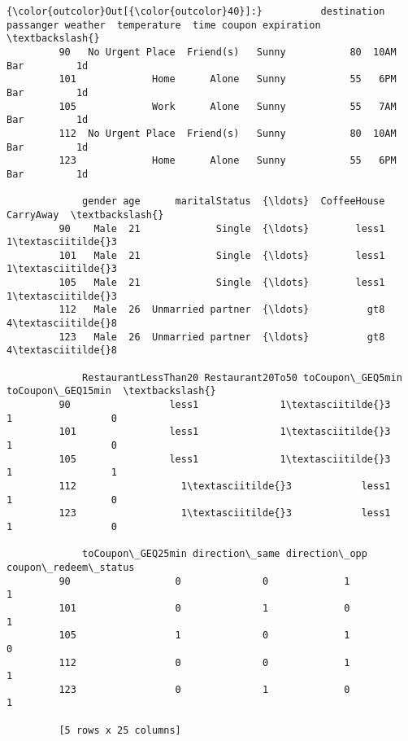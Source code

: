 \documentclass[11pt]{article}
\begin{document}
\begin{Verbatim}[commandchars=\\\{\}]
{\color{outcolor}Out[{\color{outcolor}40}]:}          destination  passanger weather  temperature  time coupon expiration  \textbackslash{}
         90   No Urgent Place  Friend(s)   Sunny           80  10AM    Bar         1d   
         101             Home      Alone   Sunny           55   6PM    Bar         1d   
         105             Work      Alone   Sunny           55   7AM    Bar         1d   
         112  No Urgent Place  Friend(s)   Sunny           80  10AM    Bar         1d   
         123             Home      Alone   Sunny           55   6PM    Bar         1d   
         
             gender age      maritalStatus  {\ldots}  CoffeeHouse CarryAway  \textbackslash{}
         90    Male  21             Single  {\ldots}        less1       1\textasciitilde{}3   
         101   Male  21             Single  {\ldots}        less1       1\textasciitilde{}3   
         105   Male  21             Single  {\ldots}        less1       1\textasciitilde{}3   
         112   Male  26  Unmarried partner  {\ldots}          gt8       4\textasciitilde{}8   
         123   Male  26  Unmarried partner  {\ldots}          gt8       4\textasciitilde{}8   
         
             RestaurantLessThan20 Restaurant20To50 toCoupon\_GEQ5min toCoupon\_GEQ15min  \textbackslash{}
         90                 less1              1\textasciitilde{}3                1                 0   
         101                less1              1\textasciitilde{}3                1                 0   
         105                less1              1\textasciitilde{}3                1                 1   
         112                  1\textasciitilde{}3            less1                1                 0   
         123                  1\textasciitilde{}3            less1                1                 0   
         
             toCoupon\_GEQ25min direction\_same direction\_opp  coupon\_redeem\_status  
         90                  0              0             1                     1  
         101                 0              1             0                     1  
         105                 1              0             1                     0  
         112                 0              0             1                     1  
         123                 0              1             0                     1  
         
         [5 rows x 25 columns]
\end{Verbatim}
            
\end{document}
